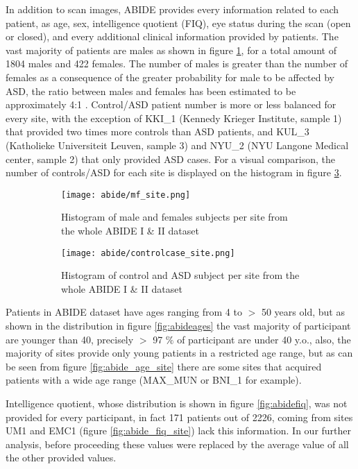 \documentclass[11pt]{report}
\begin{document}
In addition to scan images, ABIDE provides every information related to each patient, as age, sex, intelligence quotient (FIQ), eye status during the scan (open or closed), and every additional clinical information provided by patients.
The vast majority of patients are males as shown in figure \ref{fig:mf_site}, for a total amount of 1804 males and 422 females.
The number of males is greater than the number of females as a consequence of the greater probability for male to be affected by ASD, the ratio between males and females has been estimated to be approximately 4:1 \cite{fombonne2009}.
Control/ASD patient number is more or less balanced for every site, with the exception of KKI\_1 (Kennedy Krieger Institute, sample 1) that provided two times more controls than ASD patients, and KUL\_3 (Katholieke Universiteit Leuven, sample 3) and NYU\_2 (NYU Langone Medical center, sample 2) that only provided ASD cases. 
For a visual comparison, the number of controls/ASD for each site is displayed on the histogram in figure \ref{fig:controlcase_site}.

\begin{figure}[h]
\centering
\begin{subfigure}{0.9\textwidth}
\texttt{[image: abide/mf\_site.png]}
\caption{Histogram of male and females subjects per site from the whole ABIDE I \& II dataset}
\label{fig:mf_site}
\end{subfigure}
\begin{subfigure}{0.9\textwidth}
\texttt{[image: abide/controlcase\_site.png]}
\caption{Histogram of control and ASD subject per site from the whole ABIDE I \& II dataset}
\label{fig:controlcase_site}
\end{subfigure}
\caption{}
 
\end{figure}


Patients in ABIDE dataset have ages ranging from 4 to $>$ 50 years old, but as shown in the distribution in figure \ref{fig:abideages} the vast majority of participant are younger than 40, precisely $>$ 97 $\%$ of participant are under 40 y.o., also, the majority of sites provide only young patients in a restricted age range, but  as can be seen from figure \ref{fig:abide_age_site} there are some sites that acquired patients with a wide age range (MAX\_MUN or BNI\_1 for example).


Intelligence quotient, whose distribution is shown in figure \ref{fig:abidefiq}, was not provided for every participant, in fact 171 patients out of 2226, coming from sites UM1 and EMC1 (figure \ref{fig:abide_fiq_site}) lack this information.
In our further analysis, before proceeding these values were replaced by the average value of all the other provided values.
\end{document}
